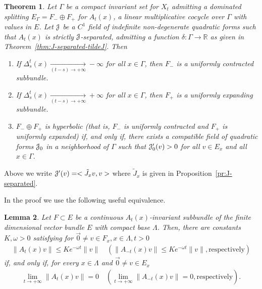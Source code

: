 \documentclass[12pt,reqno]{amsart}
\numberwithin{equation}{section}
\theoremstyle{plain}
\newtheorem{theorem}{Theorem}[section]
\newtheorem{lemma}[theorem]{Lemma}
\theoremstyle{definition}
\newcommand{\RR}{{\mathbb R}}
\newcommand{\J}{\EuScript{J}}
\begin{document}
\begin{theorem}
  \label{thm:char-dom-split}
  Let $\Gamma$ be a compact invariant set for $X_t$
  admitting a dominated splitting $E_\Gamma= F_-\oplus F_+$
  for $A_t(x)$, a linear multiplicative cocycle over
  $\Gamma$ with values in $E$. Let $\J$ be a $C^1$ field of
  indefinite non-degenerate quadratic forms such that
  $A_t(x)$ is strictly $\J$-separated, admitting a function
  $\delta:\Gamma\to\RR$ as given in
  Theorem~\ref{thm:J-separated-tildeJ}. Then
  \begin{enumerate}
  \item If
    $\Delta_s^t(x)\xrightarrow[(t-s)\to+\infty]{}-\infty$
    for all $x\in\Gamma$, then $F_-$ is a uniformly
    contracted subbundle.
  \item If $\Delta_s^t(x)\xrightarrow[(t-s)\to+\infty]{} +\infty$
for all $x\in\Gamma$, then $F_+$ is a uniformly expanding subbundle.
  \item $F_-\oplus F_+$ is hyperbolic (that is, $F_-$ is
    uniformly contracted and $F_+$ is uniformly expanded)
    if, and only if, there exists a compatible field
    of quadratic forms $\J_0$ in a neighborhood of $\Gamma$ such
    that $\J_0'(v)>0$ for all $v\in E_x$ and all $x\in\Gamma$.
  \end{enumerate}
\end{theorem}

Above we write $\J'(v)= <\tilde J_x v, v>$ where
$\tilde J_x$ is given in Proposition~\ref{pr:J-separated}.

In the proof we use the following useful equivalence.

\begin{lemma}
  \label{le:unif-behav-lim0}
  Let $F\subset E$ be a continuous $A_t(x)$-invariant
  subbundle of the finite dimensional vector bundle $E$
  with compact base $\Lambda$. Then, there are
  constants $K,\omega>0$ satisfying for $\vec0\neq v\in
  F_x, x\in\Lambda, t>0$
  \begin{align*}
    \|A_t(x)v\|\le K e^{-\omega t} \|v\| \quad
    (\|A_{-t}(x)v\|\le K e^{-\omega t} \|v\|, \text{
      respectively})
  \end{align*}
  if, and only if, for every $x\in\Lambda$ and $\vec0\neq
  v\in E_x$
  \begin{align*}
    \lim\limits_{t\to+\infty}\|A_t(x)v\| = 0 \quad
    (\lim\limits_{t\to+\infty}\|A_{-t}(x)v\| = 0, \text{
      respectively}).
  \end{align*}
\end{lemma}
\end{document}
